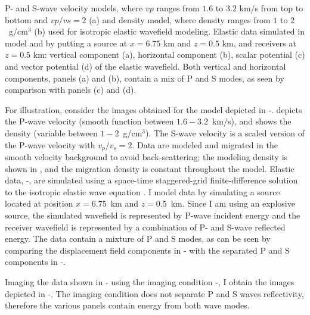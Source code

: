 {P- and S-wave velocity models, where $vp$ ranges from $1.6$ to $3.2$ km/s from top to bottom and $vp/vs=2$ (a) and density model, where density ranges from $1$ to $2$~g/cm$^3$ (b) used for  isotropic elastic wavefield modeling.}
{Elastic data simulated in model  and  by putting a source at $x=6.75$ km and $z=0.5$ km, and receivers at $z=0.5$ km: vertical component (a), horizontal component (b), scalar potential (c) and vector potential (d) of the elastic wavefield. Both vertical and horizontal components, panels (a) and (b), contain a mix of P and S modes, as seen by comparison with panels (c) and (d).}

For illustration, consider the images obtained for the model depicted  in -.  depicts the P-wave velocity (smooth function between $1.6-3.2$~km/s), and  shows the density  (variable between $1-2$~g/cm$^3$). The S-wave velocity is a scaled  version of the P-wave velocity with $v_p/v_s=2$. Data are modeled and  migrated in the smooth velocity background to avoid back-scattering;  the modeling density is shown in , and the migration density is constant throughout the model.    Elastic data, -, are simulated using a space-time staggered-grid finite-difference solution to the isotropic elastic
wave equation \cite[]{GEO49-11-19331942,GEO51-04-08890901,GEO52-09-12111228,GEO53-06-07500759}.
I model data by simulating a source located at position $x=6.75$~km and  $z=0.5$~km. Since I am using an explosive source, the simulated  wavefield is represented by P-wave incident energy and the receiver  wavefield is represented by a combination of P- and S-wave reflected  energy. The data contain a mixture of P and S modes, as can be seen by  comparing the displacement field components in - with the separated P and S components in -.

Imaging the data shown in - using the imaging  condition -, I obtain the images depicted in  -. The imaging condition does not separate P  and S waves reflectivity, therefore the various panels contain energy from both wave modes.

